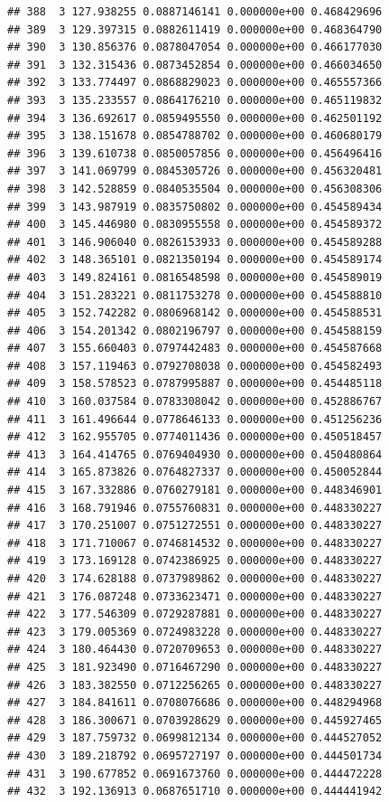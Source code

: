 \documentclass[article]{jss}\usepackage[]{graphicx}\usepackage[]{xcolor}
\makeatletter
\newenvironment{kframe}{%
 \def\at@end@of@kframe{}%
 \ifinner\ifhmode%
  \def\at@end@of@kframe{\end{minipage}}%
  \begin{minipage}{\columnwidth}%
 \fi\fi%
 \def\FrameCommand##1{\hskip\@totalleftmargin \hskip-\fboxsep
 \colorbox{shadecolor}{##1}\hskip-\fboxsep
     \hskip-\linewidth \hskip-\@totalleftmargin \hskip\columnwidth}%
 \MakeFramed {\advance\hsize-\width
   \@totalleftmargin\z@ \linewidth\hsize
   \@setminipage}}%
 {\par\unskip\endMakeFramed%
 \at@end@of@kframe}
\newenvironment{knitrout}{}{} %
\makeatother
\begin{document}
\begin{knitrout}
\begin{kframe}
\begin{verbatim}
## 388  3 127.938255 0.0887146141 0.000000e+00 0.468429696
## 389  3 129.397315 0.0882611419 0.000000e+00 0.468364790
## 390  3 130.856376 0.0878047054 0.000000e+00 0.466177030
## 391  3 132.315436 0.0873452854 0.000000e+00 0.466034650
## 392  3 133.774497 0.0868829023 0.000000e+00 0.465557366
## 393  3 135.233557 0.0864176210 0.000000e+00 0.465119832
## 394  3 136.692617 0.0859495550 0.000000e+00 0.462501192
## 395  3 138.151678 0.0854788702 0.000000e+00 0.460680179
## 396  3 139.610738 0.0850057856 0.000000e+00 0.456496416
## 397  3 141.069799 0.0845305726 0.000000e+00 0.456320481
## 398  3 142.528859 0.0840535504 0.000000e+00 0.456308306
## 399  3 143.987919 0.0835750802 0.000000e+00 0.454589434
## 400  3 145.446980 0.0830955558 0.000000e+00 0.454589372
## 401  3 146.906040 0.0826153933 0.000000e+00 0.454589288
## 402  3 148.365101 0.0821350194 0.000000e+00 0.454589174
## 403  3 149.824161 0.0816548598 0.000000e+00 0.454589019
## 404  3 151.283221 0.0811753278 0.000000e+00 0.454588810
## 405  3 152.742282 0.0806968142 0.000000e+00 0.454588531
## 406  3 154.201342 0.0802196797 0.000000e+00 0.454588159
## 407  3 155.660403 0.0797442483 0.000000e+00 0.454587668
## 408  3 157.119463 0.0792708038 0.000000e+00 0.454582493
## 409  3 158.578523 0.0787995887 0.000000e+00 0.454485118
## 410  3 160.037584 0.0783308042 0.000000e+00 0.452886767
## 411  3 161.496644 0.0778646133 0.000000e+00 0.451256236
## 412  3 162.955705 0.0774011436 0.000000e+00 0.450518457
## 413  3 164.414765 0.0769404930 0.000000e+00 0.450480864
## 414  3 165.873826 0.0764827337 0.000000e+00 0.450052844
## 415  3 167.332886 0.0760279181 0.000000e+00 0.448346901
## 416  3 168.791946 0.0755760831 0.000000e+00 0.448330227
## 417  3 170.251007 0.0751272551 0.000000e+00 0.448330227
## 418  3 171.710067 0.0746814532 0.000000e+00 0.448330227
## 419  3 173.169128 0.0742386925 0.000000e+00 0.448330227
## 420  3 174.628188 0.0737989862 0.000000e+00 0.448330227
## 421  3 176.087248 0.0733623471 0.000000e+00 0.448330227
## 422  3 177.546309 0.0729287881 0.000000e+00 0.448330227
## 423  3 179.005369 0.0724983228 0.000000e+00 0.448330227
## 424  3 180.464430 0.0720709653 0.000000e+00 0.448330227
## 425  3 181.923490 0.0716467290 0.000000e+00 0.448330227
## 426  3 183.382550 0.0712256265 0.000000e+00 0.448330227
## 427  3 184.841611 0.0708076686 0.000000e+00 0.448294968
## 428  3 186.300671 0.0703928629 0.000000e+00 0.445927465
## 429  3 187.759732 0.0699812134 0.000000e+00 0.444527052
## 430  3 189.218792 0.0695727197 0.000000e+00 0.444501734
## 431  3 190.677852 0.0691673760 0.000000e+00 0.444472228
## 432  3 192.136913 0.0687651710 0.000000e+00 0.444441942

\end{verbatim}
\end{kframe}
\end{knitrout}
\end{document}
